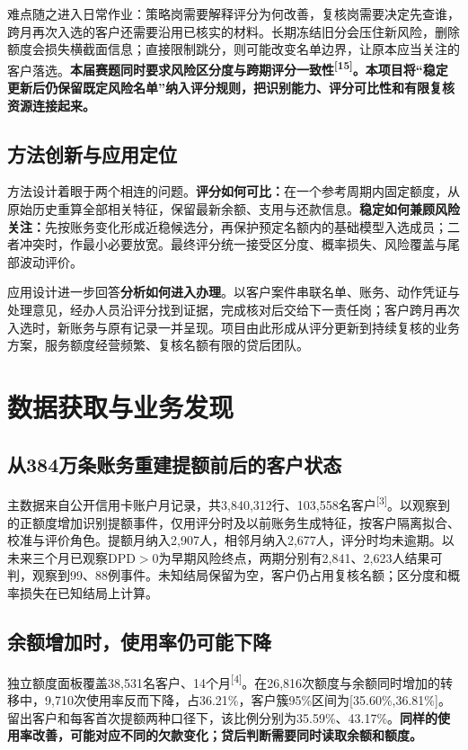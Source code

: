 \documentclass[a4paper,10pt]{article}
\begin{document}
难点随之进入日常作业：策略岗需要解释评分为何改善，复核岗需要决定先查谁，跨月再次入选的客户还需要沿用已核实的材料。长期冻结旧分会压住新风险，删除额度会损失横截面信息；直接限制跳分，则可能改变名单边界，让原本应当关注的客户落选。\textbf{本届赛题同时要求风险区分度与跨期评分一致性\textsuperscript{[15]}。本项目将“稳定更新后仍保留既定风险名单”纳入评分规则，把识别能力、评分可比性和有限复核资源连接起来。}

\subsection{方法创新与应用定位}
方法设计着眼于两个相连的问题。\textbf{评分如何可比：}在一个参考周期内固定额度，从原始历史重算全部相关特征，保留最新余额、支用与还款信息。\textbf{稳定如何兼顾风险关注：}先按账务变化形成近稳候选分，再保护预定名额内的基础模型入选成员；二者冲突时，作最小必要放宽。最终评分统一接受区分度、概率损失、风险覆盖与尾部波动评价。

应用设计进一步回答\textbf{分析如何进入办理}。以客户案件串联名单、账务、动作凭证与处理意见，经办人员沿评分找到证据，完成核对后交给下一责任岗；客户跨月再次入选时，新账务与原有记录一并呈现。项目由此形成从评分更新到持续复核的业务方案，服务额度经营频繁、复核名额有限的贷后团队。

\clearpage
\section{数据获取与业务发现}
\subsection{从384万条账务重建提额前后的客户状态}
主数据来自公开信用卡账户月记录，共3,840,312行、103,558名客户\textsuperscript{[3]}。以观察到的正额度增加识别提额事件，仅用评分时及以前账务生成特征，按客户隔离拟合、校准与评价角色。提额月纳入2,907人，相邻月纳入2,677人，评分时均未逾期。以未来三个月已观察DPD$>0$为早期风险终点，两期分别有2,841、2,623人结果可判，观察到99、88例事件。未知结局保留为空，客户仍占用复核名额；区分度和概率损失在已知结局上计算。



\subsection{余额增加时，使用率仍可能下降}
独立额度面板覆盖38,531名客户、14个月\textsuperscript{[4]}。在26,816次额度与余额同时增加的转移中，9,710次使用率反而下降，占36.21\%，客户簇95\%区间为[35.60\%,36.81\%]。留出客户和每客首次提额两种口径下，该比例分别为35.59\%、43.17\%。\textbf{同样的使用率改善，可能对应不同的欠款变化；贷后判断需要同时读取余额和额度。}
\end{document}
